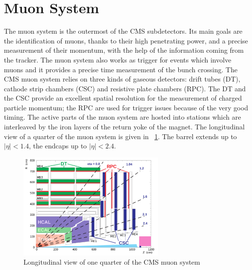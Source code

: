 \section{Muon System}
The muon system is the outermost of the CMS subdetectors. Its main goals are the identification of muons, thanks to their high penetrating power, and a precise measurement of their momentum, with the help of the information coming from the tracker. The muon system also works as trigger for events which involve muons and it provides a precise time measurement of the bunch crossing. The CMS muon system \cite{muon} relies on three kinds of gaseous detectors: drift tubes (DT), cathode strip chambers (CSC) and resistive plate chambers (RPC). The DT and the CSC provide an excellent spatial resolution for the measurement of charged particle momentum; the RPC are used for trigger issues because of the very good timing. The active parts of the muon system are hosted into stations which are interleaved by the iron layers of the return yoke of the magnet. The longitudinal view of a quarter of the muon system is given in \figurename~\ref{fig:muon}. The barrel extends up to $|\eta|<1.4$, the endcaps up to $|\eta|<2.4$. 
\begin{figure}[h!]
 \centering
 \includegraphics[width=0.65\textwidth]{Images/muonsyst.pdf}
 \caption{Longitudinal view of one quarter of the CMS muon system}
\label{fig:muon}
\end{figure}

